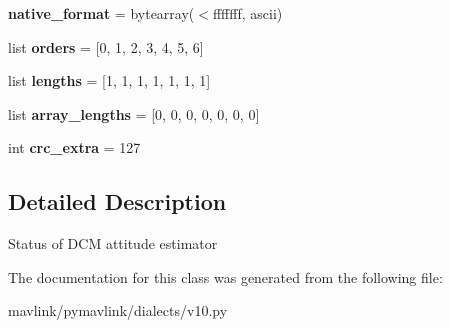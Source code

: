 \begin{DoxyCompactItemize}
\item 
\mbox{\label{classpymavlink_1_1dialects_1_1v10_1_1MAVLink__ahrs__message_a250b4d41f725c770ec25d1efff097d36}} 
{\bfseries native\+\_\+format} = bytearray(\textquotesingle{}$<$fffffff\textquotesingle{}, \textquotesingle{}ascii\textquotesingle{})
\item 
\mbox{\label{classpymavlink_1_1dialects_1_1v10_1_1MAVLink__ahrs__message_a02d81dc6e3fa562c67ee6304e89676ab}} 
list {\bfseries orders} = \mbox{[}0, 1, 2, 3, 4, 5, 6\mbox{]}
\item 
\mbox{\label{classpymavlink_1_1dialects_1_1v10_1_1MAVLink__ahrs__message_aa4524ba6eed5f71351241574e758c2a2}} 
list {\bfseries lengths} = \mbox{[}1, 1, 1, 1, 1, 1, 1\mbox{]}
\item 
\mbox{\label{classpymavlink_1_1dialects_1_1v10_1_1MAVLink__ahrs__message_a0c3b28fd705df9236b66808b4ba2d323}} 
list {\bfseries array\+\_\+lengths} = \mbox{[}0, 0, 0, 0, 0, 0, 0\mbox{]}
\item 
\mbox{\label{classpymavlink_1_1dialects_1_1v10_1_1MAVLink__ahrs__message_a90ef0d63d02d4b899faa53ddac0d1c8b}} 
int {\bfseries crc\+\_\+extra} = 127
\end{DoxyCompactItemize}


\subsection{Detailed Description}
\begin{DoxyVerb}Status of DCM attitude estimator
\end{DoxyVerb}
 

The documentation for this class was generated from the following file\+:\begin{DoxyCompactItemize}
\item 
mavlink/pymavlink/dialects/v10.\+py\end{DoxyCompactItemize}
